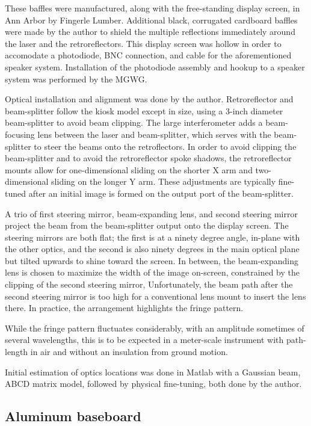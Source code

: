 These baffles were manufactured, along with the free-standing display screen, in Ann Arbor by Fingerle Lumber.
Additional black, corrugated cardboard baffles were made by the author to shield the multiple reflections immediately around the laser and the retroreflectors.
This display screen was hollow in order to accomodate a photodiode, BNC connection, and cable for the aforementioned speaker system.
Installation of the photodiode assembly and hookup to a speaker system was performed by the MGWG.

Optical installation and alignment was done by the author.
Retroreflector and beam-splitter follow the kiosk model except in size, using a 3-inch diameter beam-splitter to avoid beam clipping.
The large interferometer adds a beam-focusing lens between the laser and beam-splitter, which serves with the beam-splitter to steer the beams onto the retroflectors.
In order to avoid clipping the beam-splitter and to avoid the retroreflector spoke shadows, the retroreflector mounts allow for one-dimensional sliding on the shorter X arm and two-dimensional sliding on the longer Y arm.
These adjustments are typically fine-tuned after an initial image is formed on the output port of the beam-splitter.

A trio of first steering mirror, beam-expanding lens, and second steering mirror project the beam from the beam-splitter output onto the display screen.
The steering mirrors are both flat; the first is at a ninety degree angle, in-plane with the other optics, and the second is also ninety degrees in the main optical plane but tilted upwards to shine toward the screen.
In between, the beam-expanding lens is chosen to maximize the width of the image on-screen, constrained by the clipping of the second steering mirror,
Unfortunately, the beam path after the second steering mirror is too high for a conventional lens mount to insert the lens there.
In practice, the arrangement highlights the fringe pattern.

While the fringe pattern fluctuates considerably, with an amplitude sometimes of several wavelengths, this is to be expected in a meter-scale instrument with path-length in air and without an insulation from ground motion.

Initial estimation of optics locations was done in Matlab with a Gaussian beam, ABCD matrix model, followed by physical fine-tuning, both done by the author.

        \subsection{Aluminum baseboard}
        \label{baseplate}

